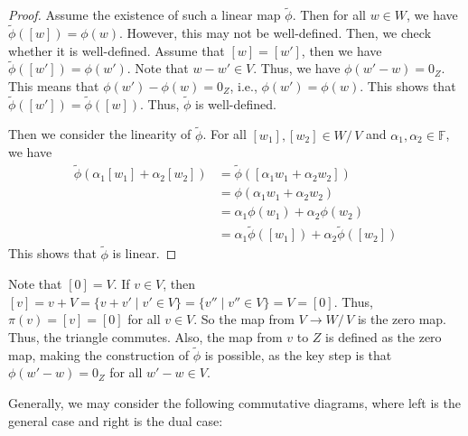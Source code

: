 \documentclass[
	11pt, %
	fleqn, %
	a4paper, %
]{LegrandOrangeBook}
\renewcommand{\ker}[1]{\text{Ker}(#1)} %
\renewcommand{\Im}[1]{\text{Im}(#1)} %
\newcommand{\quotient}[2]{#1 /\, #2} %
\newcommand{\F}{\mathbb{F}} %
\newcommand{\coker}[1]{\text{Coker}(#1)} %
\newcommand{\coim}[1]{\text{Coim}(#1)} %
\begin{document}
\begin{proof}
    Assume the existence of such a linear map $\tilde{\phi}$. Then for all $w \in W$, we have $\tilde{\phi}([w]) = \phi(w)$. However, this may not be well-defined. Then, we check whether it is well-defined. Assume that $[w] = [w']$, then we have $\tilde{\phi}([w']) = \phi(w')$. Note that $w - w' \in V$. Thus, we have $\phi(w' - w) = 0_Z$. This means that $\phi(w') - \phi(w) = 0_Z$, i.e., $\phi(w') = \phi(w)$. This shows that $\tilde{\phi}([w']) = \tilde{\phi}([w])$. Thus, $\tilde{\phi}$ is well-defined.

    Then we consider the linearity of $\tilde{\phi}$. For all $[w_1], [w_2] \in \quotient{W}{V}$ and $\alpha_1, \alpha_2 \in \F$, we have
    \[
        \begin{split}
            \tilde{\phi}(\alpha_1 [w_1] + \alpha_2 [w_2]) &= \tilde{\phi}([\alpha_1 w_1 + \alpha_2 w_2]) \\
            &= \phi(\alpha_1 w_1 + \alpha_2 w_2) \\
            &= \alpha_1 \phi(w_1) + \alpha_2 \phi(w_2) \\
            &= \alpha_1 \tilde{\phi}([w_1]) + \alpha_2 \tilde{\phi}([w_2])
        \end{split}
    \]
    This shows that $\tilde{\phi}$ is linear.
\end{proof}

\begin{remark}
    Note that $[0] = V$. If $v \in V$, then $[v] = v + V = \{v + v' \mid v' \in V\} = \{v'' \mid v'' \in V\} = V = [0]$. Thus, $\pi(v) = [v] = [0]$ for all $v \in V$. So the map from $V \to \quotient{W}{V}$ is the zero map. Thus, the triangle commutes. Also, the map from $v$ to $Z$ is defined as the zero map, making the construction of $\tilde{\phi}$ is possible, as the key step is that $\phi(w' - w) = 0_Z$ for all $w' - w \in V$.
\end{remark}

Generally, we may consider the following commutative diagrams, where left is the general case and right is the dual case:

\begin{center}
\end{center}
\end{document}
